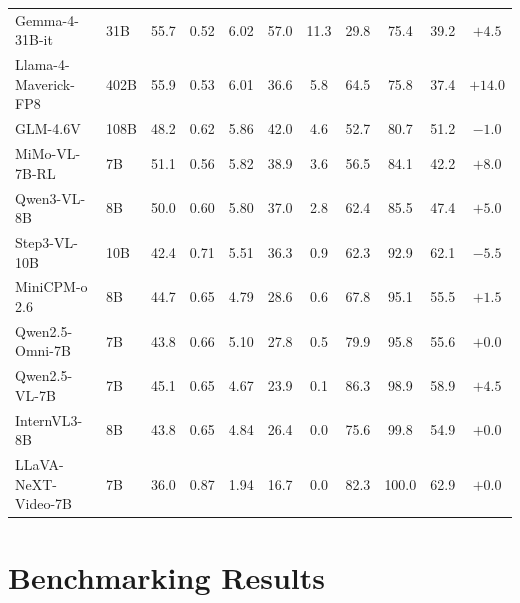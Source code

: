 \documentclass{article}
\begin{document}
\begin{table}[t]
{\begin{tabular}{l@{\hspace{0.4em}}l@{\hspace{1.0em}}cccc@{\hspace{1.0em}}cccc@{\hspace{1.0em}}c}
Gemma-4-31B-it~\cite{deepmind2025gemma4}       & 31B  & 55.7 & 0.52 & 6.02 & 57.0 & 11.3 & 29.8          & 75.4          & 39.2        & $+4.5$  \\
Llama-4-Maverick-FP8~\cite{meta2025llama4maverick} & 402B & 55.9 & 0.53 & 6.01 & 36.6 &  5.8 & 64.5          & 75.8          & 37.4        & $+14.0$ \\
GLM-4.6V~\cite{hong2025glm}                & 108B & 48.2 & 0.62 & 5.86 & 42.0 &  4.6 & 52.7          & 80.7          & 51.2        & $-1.0$  \\
MiMo-VL-7B-RL~\cite{li2025mimo}        & 7B   & 51.1 & 0.56 & 5.82 & 38.9 &  3.6 & 56.5          & 84.1          & 42.2        & $+8.0$  \\
Qwen3-VL-8B~\cite{bai2025qwen25vl}          & 8B   & 50.0 & 0.60 & 5.80 & 37.0 &  2.8 & 62.4          & 85.5          & 47.4        & $+5.0$  \\
Step3-VL-10B~\cite{huang2026step3vl}         & 10B  & 42.4 & 0.71 & 5.51 & 36.3 &  0.9 & 62.3          & 92.9          & 62.1        & $-5.5$  \\
MiniCPM-o 2.6~\cite{yao2024minicpmv}        & 8B   & 44.7 & 0.65 & 4.79 & 28.6 &  0.6 & 67.8          & 95.1          & 55.5        & $+1.5$  \\
Qwen2.5-Omni-7B~\cite{xu2025qwen3}          & 7B   & 43.8 & 0.66 & 5.10 & 27.8 &  0.5 & 79.9          & 95.8          & 55.6        & $+0.0$  \\
Qwen2.5-VL-7B~\cite{bai2025qwen25vl}        & 7B   & 45.1 & 0.65 & 4.67 & 23.9 &  0.1 & 86.3          & 98.9          & 58.9        & $+4.5$  \\
InternVL3-8B~\cite{chen2024internvl}         & 8B   & 43.8 & 0.65 & 4.84 & 26.4 &  0.0 & 75.6          & 99.8          & 54.9        & $+0.0$  \\
LLaVA-NeXT-Video-7B~\cite{liu2024llava15}  & 7B   & 36.0 & 0.87 & 1.94 & 16.7 &  0.0 & 82.3          & 100.0         & 62.9        & $+0.0$  \\
\bottomrule
\end{tabular}%
}
\vspace{-0.5cm}
\end{table}

\vspace{-0.2cm}
\section{Benchmarking Results}
\label{sec:exp}
\end{document}

